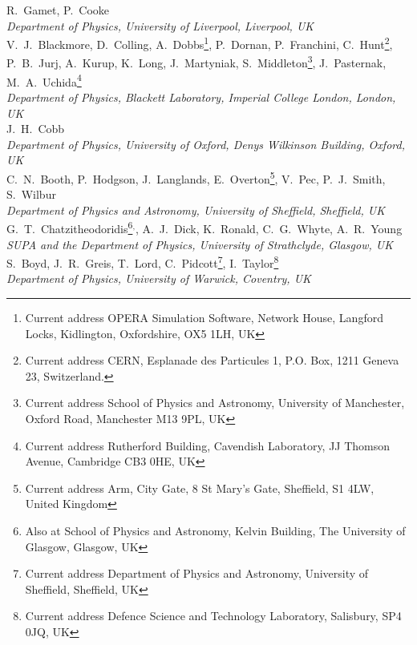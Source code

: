 R.~Gamet, P.~Cooke
\\{\it
Department of Physics, University of Liverpool, Liverpool, UK
}\\

V.~J.~Blackmore, D.~Colling, A.~Dobbs\footnote{Current address OPERA Simulation Software, Network House, Langford Locks, Kidlington, Oxfordshire, OX5 1LH, UK}, P.~Dornan, P.~Franchini, C.~Hunt\footnote{Current address CERN, Esplanade des Particules 1, P.O. Box, 1211 Geneva 23, Switzerland.}, P.~B.~Jurj, A.~Kurup, K.~Long, J.~Martyniak,  S.~Middleton\footnote{Current address School of Physics and Astronomy, University of Manchester, Oxford Road, Manchester M13 9PL, UK}, J.~Pasternak, M.~A.~Uchida\footnote{Current address Rutherford Building, Cavendish Laboratory, JJ Thomson Avenue, Cambridge CB3 0HE, UK}
\\{\it
Department of Physics, Blackett Laboratory, Imperial College London, London, UK
}\\

J.~H.~Cobb
\\{\it
Department of Physics, University of Oxford, Denys Wilkinson Building, Oxford, UK
}\\

C.~N.~Booth, P.~Hodgson, J.~Langlands, E.~Overton\footnote{Current address Arm, City Gate, 8 St Mary's Gate, Sheffield, S1 4LW, United Kingdom}, V.~Pec,  P.~J.~Smith, S.~Wilbur
\\{\it
Department of Physics and Astronomy, University of Sheffield, Sheffield, UK
}\\

G.~T.~Chatzitheodoridis\footnote{Also at School of Physics and Astronomy, Kelvin Building, The University of Glasgow, Glasgow, UK}$^,$\footnotemark, A.~J.~Dick\footnotemark[\value{footnote}],  K.~Ronald\footnotemark[\value{footnote}], C.~G.~Whyte\footnotemark[\value{footnote}], A.~R.~Young\footnotemark[\value{footnote}]
\\{\it
SUPA and the Department of Physics, University of Strathclyde, Glasgow, UK
}\\

S.~Boyd,  J.~R.~Greis, T.~Lord, C.~Pidcott\footnote{Current address Department of Physics and Astronomy, University of Sheffield, Sheffield, UK}, I.~Taylor\footnote{Current address Defence Science and Technology Laboratory, Salisbury, SP4 0JQ, UK}
\\{\it
Department of Physics, University of Warwick, Coventry, UK
}\\


